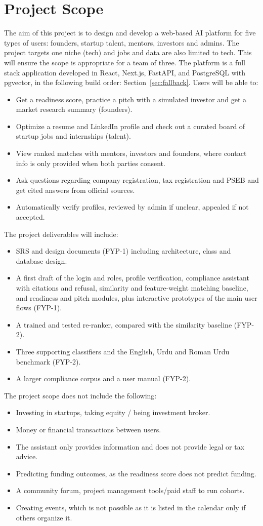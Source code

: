 \documentclass{FastFyp}
\begin{document}
\section{Project Scope}\label{sec:scope}
The aim of this project is to design and develop a web-based AI platform for five types of users: founders, startup talent, mentors, investors and admins. The project targets one niche (tech) and jobs and data are also limited to tech. This will ensure the scope is appropriate for a team of three. The platform is a full stack application developed in React, Next.js, FastAPI, and PostgreSQL with pgvector, in the following build order: Section~\ref{sec:fallback}. Users will be able to:
\begin{itemize}
\item Get a readiness score, practice a pitch with a simulated investor and get a market research summary (founders).
\item Optimize a resume and LinkedIn profile and check out a curated board of startup jobs and internships (talent).
\item View ranked matches with mentors, investors and founders, where contact info is only provided when both parties consent.
\item Ask questions regarding company registration, tax registration and PSEB and get cited answers from official sources.
\item Automatically verify profiles, reviewed by admin if unclear, appealed if not accepted.
\end{itemize}
The project deliverables will include:
\begin{itemize}
\item SRS and design documents (FYP-1) including architecture, class and database design.
\item A first draft of the login and roles, profile verification, compliance assistant with citations and refusal, similarity and feature-weight matching baseline, and readiness and pitch modules, plus interactive prototypes of the main user flows (FYP-1).
\item A trained and tested re-ranker, compared with the similarity baseline (FYP-2).
\item Three supporting classifiers and the English, Urdu and Roman Urdu benchmark (FYP-2).
\item A larger compliance corpus and a user manual (FYP-2).
\end{itemize}
The project scope does not include the following:
\begin{itemize}
\item Investing in startups, taking equity / being investment broker.
\item Money or financial transactions between users.
\item The assistant only provides information and does not provide legal or tax advice.
\item Predicting funding outcomes, as the readiness score does not predict funding.
\item A community forum, project management tools/paid staff to run cohorts.
\item Creating events, which is not possible as it is listed in the calendar only if others organize it.
\end{itemize}
\end{document}
